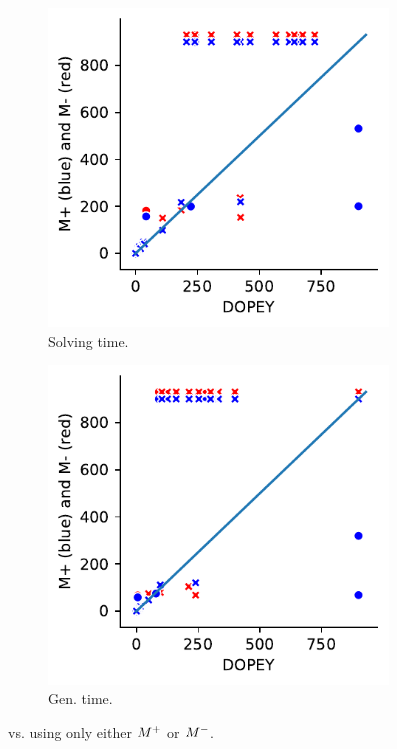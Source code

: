 \begin{figure}[t]
  \centering
  \begin{subfigure}{0.48\textwidth}
  \centering
    \includegraphics[width=0.99\textwidth]{figures/res-PN_vs_dpy_solving.pdf}
    \caption{Solving time.}
    \label{subfig:flame}
  \end{subfigure}
  \begin{subfigure}{0.48\textwidth}
  \centering
    \includegraphics[width=0.99\textwidth]{figures/res-PN_vs_dpy_ind_gen.pdf}
    \caption{Gen. time.}
    \label{subfig:dpy_vs_np_total_sub}
	\end{subfigure}
\caption{\dpy vs. using only either {\color{blue}$M^+$} or {\color{red}$M^-$}.}
\label{fig:dpy_vs_np}
\end{figure}